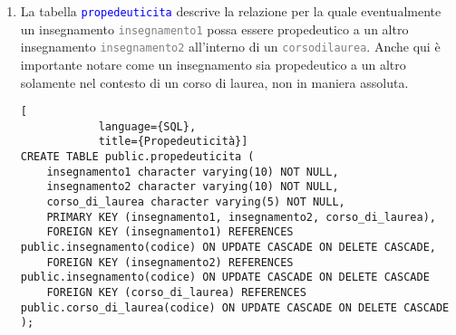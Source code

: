 \documentclass{article}
\newcommand{\tabb}[1]{\texttt{\textcolor{blue}{#1}}}
\newcommand{\attr}[1]{\texttt{\textcolor{gray}{#1}}}
\newcommand{\und}[0]{\textunderscore}
\begin{document}
\begin{enumerate}
        \begin{lstlisting}[
            language={SQL},
            title={Insegnamento parte di un Corso di Laurea}]
CREATE TABLE public.insegnamento_parte_di_cdl (
    insegnamento character varying(10) NOT NULL,
    corso_di_laurea character varying(5) NOT NULL,
    anno integer NOT NULL,
    PRIMARY KEY (insegnamento, corso_di_laurea, anno),
    FOREIGN KEY (corso_di_laurea) REFERENCES public.corso_di_laurea(codice) ON UPDATE CASCADE ON DELETE CASCADE,
    FOREIGN KEY (insegnamento) REFERENCES public.insegnamento(codice) ON UPDATE CASCADE ON DELETE CASCADE
);
        \end{lstlisting}

        \pagebreak

        \item La tabella \tabb{propedeuticita} descrive la relazione per la quale eventualmente un insegnamento \attr{insegnamento1} possa essere propedeutico a un altro insegnamento \attr{insegnamento2} all'interno di un \attr{corso\und di\und laurea}. Anche qui è importante notare come un insegnamento sia propedeutico a un altro solamente nel contesto di un corso di laurea, non in maniera assoluta.

        \begin{lstlisting}[
            language={SQL},
            title={Propedeuticità}]
CREATE TABLE public.propedeuticita (
    insegnamento1 character varying(10) NOT NULL,
    insegnamento2 character varying(10) NOT NULL,
    corso_di_laurea character varying(5) NOT NULL,
    PRIMARY KEY (insegnamento1, insegnamento2, corso_di_laurea),
    FOREIGN KEY (insegnamento1) REFERENCES public.insegnamento(codice) ON UPDATE CASCADE ON DELETE CASCADE,
    FOREIGN KEY (insegnamento2) REFERENCES public.insegnamento(codice) ON UPDATE CASCADE ON DELETE CASCADE
    FOREIGN KEY (corso_di_laurea) REFERENCES public.corso_di_laurea(codice) ON UPDATE CASCADE ON DELETE CASCADE
);
        \end{lstlisting}


\end{enumerate}
\end{document}

